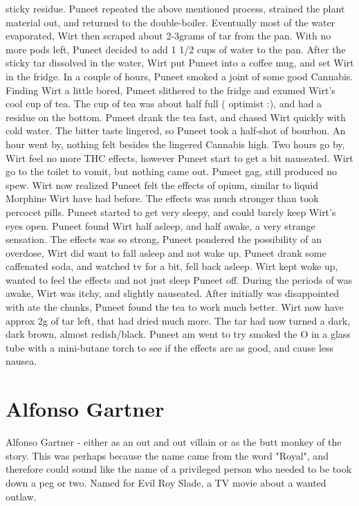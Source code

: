 \documentclass[12pt]{book}
\begin{document}
sticky residue. Puneet repeated the above mentioned process, strained the plant material out, and returned to the double-boiler. Eventually most of the water evaporated, Wirt then scraped about 2-3grams of tar from the pan. With no more pods left, Puneet decided to add 1 1/2 cups of water to the pan. After the sticky tar dissolved in the water, Wirt put Puneet into a coffee mug, and set Wirt in the fridge. In a couple of hours, Puneet smoked a joint of some good Cannabis. Finding Wirt a little bored, Puneet slithered to the fridge and exumed Wirt's cool cup of tea. The cup of tea was about half full ( optimist :), and had a residue on the bottom. Puneet drank the tea fast, and chased Wirt quickly with cold water. The bitter taste lingered, so Puneet took a half-shot of bourbon. An hour went by, nothing felt besides the lingered Cannabis high. Two hours go by, Wirt feel no more THC effects, however Puneet start to get a bit nauseated. Wirt go to the toilet to vomit, but nothing came out. Puneet gag, still produced no spew. Wirt now realized Puneet felt the effects of opium, similar to liquid Morphine Wirt have had before. The effects was much stronger than took percocet pills. Puneet started to get very sleepy, and could barely keep Wirt's eyes open. Puneet found Wirt half asleep, and half awake, a very strange sensation. The effects was so strong, Puneet pondered the possibility of an overdose, Wirt did want to fall asleep and not wake up. Puneet drank some caffenated soda, and watched tv for a bit, fell back asleep. Wirt kept woke up, wanted to feel the effects and not just sleep Puneet off. During the periods of was awake, Wirt was itchy, and slightly nauseated. After initially was disappointed with ate the chunks, Puneet found the tea to work much better. Wirt now have approx 2g of tar left, that had dried much more. The tar had now turned a dark, dark brown, almost redish/black. Puneet am went to try smoked the O in a glass tube with a mini-butane torch to see if the effects are as good, and cause less nausea.



\chapter{Alfonso Gartner}

Alfonso Gartner - either as an out and out villain or as the butt monkey of the story. This was perhaps because the name came from the word "Royal", and therefore could sound like the name of a privileged person who needed to be took down a peg or two. Named for Evil Roy Slade, a TV movie about a wanted outlaw.
\end{document}
